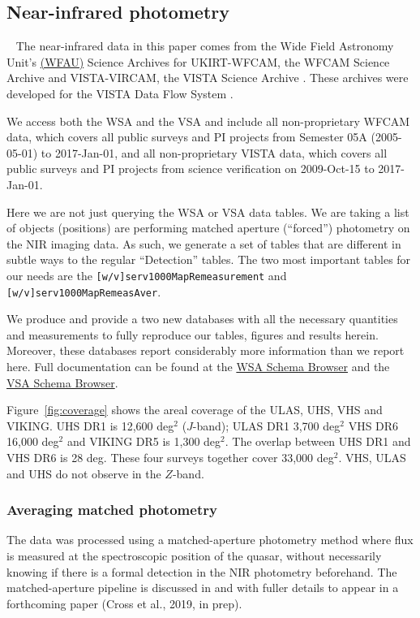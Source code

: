 \documentclass[usenatbib]{mnras}
\begin{document}
\subsection{Near-infrared photometry}~\label{sec:NIR_data} 
The near-infrared data in this paper comes from the Wide Field
Astronomy Unit's \href{https://www.roe.ac.uk/ifa/wfau/}{(WFAU)}
Science Archives for UKIRT-WFCAM, the WFCAM Science Archive
\citep[WSA; ][]{Hambly2008} and VISTA-VIRCAM, the VISTA Science
Archive \citep[VSA; ][]{Cross2012}. These archives were developed for
the VISTA Data Flow System \citep[VDFS][]{VDFS}.

We access both the WSA and the VSA and include all non-proprietary
WFCAM data, which covers all public surveys and PI projects from
Semester 05A (2005-05-01) to 2017-Jan-01, and all non-proprietary VISTA data, which
covers all public surveys and PI projects from science verification on
2009-Oct-15 to 2017-Jan-01.

Here we are not just querying the WSA or VSA data tables. We are
taking a list of objects (positions) are performing matched aperture
(``forced'') photometry on the NIR imaging data. As such, we generate
a set of tables that are different in subtle ways to the regular
``Detection'' tables.  The two most important tables for our needs are
the {\tt [w/v]serv1000MapRemeasurement} and {\tt
[w/v]serv1000MapRemeasAver}.

We produce and provide a two new databases with all the necessary
quantities and measurements to fully reproduce our tables, figures and
results herein. Moreover, these databases report considerably more
information than we report here. Full documentation can be found at
the \href{http://wsa.roe.ac.uk/www/wsa_browser.html}{WSA Schema
Browser} and the
\href{http://horus.roe.ac.uk/vsa/www/vsa_browser.html}{VSA Schema
Browser}.

Figure~\ref{fig:coverage} shows the areal coverage of the ULAS, UHS,
VHS and VIKING. UHS DR1 is 12,600 deg$^{2}$ ($J$-band); ULAS DR1 3,700
deg$^{2}$ VHS DR6 16,000 deg$^{2}$ and VIKING DR5 is 1,300
deg$^{2}$. The overlap between UHS DR1 and VHS DR6 is 28 deg. These
four surveys together cover 33,000 deg$^{2}$. VHS, ULAS and UHS do not
observe in the $Z$-band.


  \subsubsection{Averaging matched photometry}
  The data was processed using a matched-aperture photometry method
  where flux is measured at the spectroscopic position of the quasar,
  without necessarily knowing if there is a formal detection in the NIR
  photometry beforehand. The matched-aperture pipeline is discussed in
  \citet{Cross2013} and with fuller details to appear in a forthcoming
  paper (Cross et al., 2019, in prep).
\end{document}
